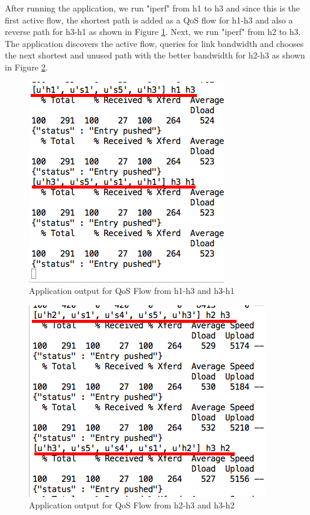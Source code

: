 \documentclass[paper=a4, fontsize=12pt]{scrartcl}	%
\numberwithin{equation}{section}		%
\numberwithin{figure}{section}			%
\numberwithin{table}{section}				%
\begin{document}
After running the application, we run "iperf" from h1 to h3 and since this is the first active flow, the shortest path is added as a QoS flow for h1-h3 and also a reverse path for h3-h1 as shown in Figure \ref{Fig 5.2}. Next, we run "iperf"  from h2 to h3. The application discovers the active flow, queries for link bandwidth and chooses the next shortest and unused path with the better bandwidth for h2-h3 as shown in Figure \ref{Fig 5.3}.
\begin{figure}[H]
\begin{center}
\includegraphics[scale=0.45]{h1-h3.png}   
\end{center}
 \caption{Application output for QoS Flow from h1-h3 and h3-h1}
 \label{Fig 5.2}
\end{figure}
\begin{figure}[H]
\begin{center}
\includegraphics[scale=0.45]{h2-h3.png}   
\end{center}
 \caption{Application output for QoS Flow from h2-h3 and h3-h2}
 \label{Fig 5.3}
\end{figure}
\end{document}
